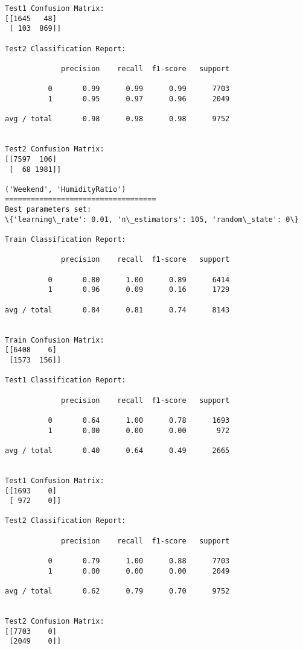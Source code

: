 \documentclass[11pt]{article}
\begin{document}
\begin{Verbatim}[commandchars=\\\{\}]
Test1 Confusion Matrix:
[[1645   48]
 [ 103  869]]

Test2 Classification Report:

             precision    recall  f1-score   support

          0       0.99      0.99      0.99      7703
          1       0.95      0.97      0.96      2049

avg / total       0.98      0.98      0.98      9752


Test2 Confusion Matrix:
[[7597  106]
 [  68 1981]]

('Weekend', 'HumidityRatio')
===================================
Best parameters set:
\{'learning\_rate': 0.01, 'n\_estimators': 105, 'random\_state': 0\}

Train Classification Report:

             precision    recall  f1-score   support

          0       0.80      1.00      0.89      6414
          1       0.96      0.09      0.16      1729

avg / total       0.84      0.81      0.74      8143


Train Confusion Matrix:
[[6408    6]
 [1573  156]]

Test1 Classification Report:

             precision    recall  f1-score   support

          0       0.64      1.00      0.78      1693
          1       0.00      0.00      0.00       972

avg / total       0.40      0.64      0.49      2665


Test1 Confusion Matrix:
[[1693    0]
 [ 972    0]]

Test2 Classification Report:

             precision    recall  f1-score   support

          0       0.79      1.00      0.88      7703
          1       0.00      0.00      0.00      2049

avg / total       0.62      0.79      0.70      9752


Test2 Confusion Matrix:
[[7703    0]
 [2049    0]]


    \end{Verbatim}
\end{document}
